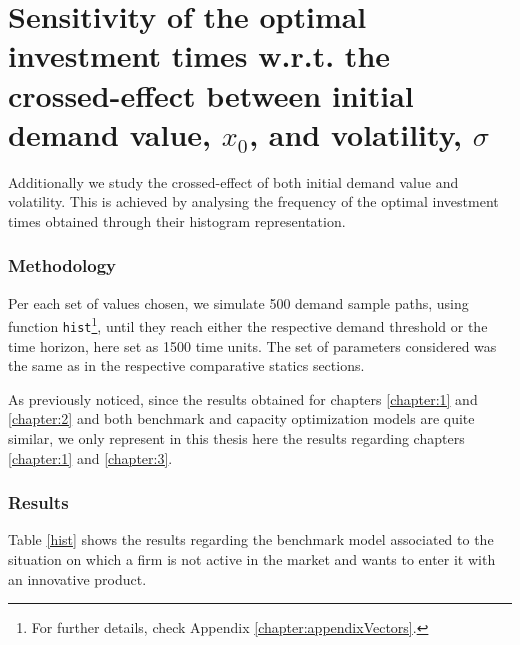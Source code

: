 \section{Sensitivity of the optimal investment times w.r.t. the crossed-effect between initial demand value, $x_0$, and volatility, $\sigma$}

Additionally we study the crossed-effect of both initial demand value and volatility. This is achieved by analysing the frequency of the optimal investment times obtained through their histogram representation.

\subsubsection{Methodology}

Per each set of values chosen, we simulate 500 demand sample paths, using function \texttt{hist}\footnote{For further details, check Appendix \ref{chapter:appendixVectors}.}, until they reach either the respective demand threshold or the time horizon, here set as 1500 time units.
The set of parameters considered was the same as in the respective comparative statics sections.

As previously noticed, since the results obtained for chapters \ref{chapter:1} and \ref{chapter:2} and both benchmark and capacity optimization models are quite similar, we only represent in this thesis here the results regarding chapters \ref{chapter:1} and \ref{chapter:3}.


\subsubsection{Results}

Table \ref{hist} shows the results regarding the benchmark model associated to the situation on which a firm is not active in the market and wants to enter it with an innovative product. 

